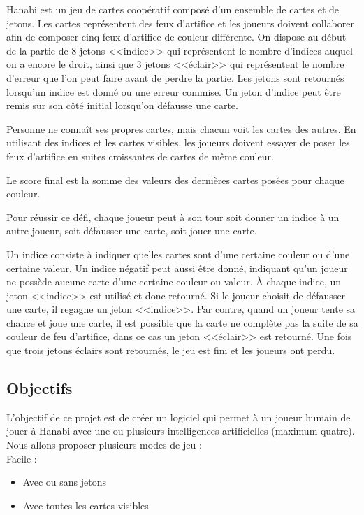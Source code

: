 \documentclass{article}
\begin{document}
Hanabi est un jeu de cartes coopératif composé d'un ensemble de cartes et de jetons. Les cartes représentent des feux d'artifice et les joueurs doivent collaborer afin de composer cinq feux d'artifice de couleur différente. On dispose au début de la partie de 8 jetons <<indice>> qui représentent le nombre d'indices auquel on a encore le droit, ainsi que 3 jetons <<éclair>> qui représentent le nombre d'erreur que l'on peut faire avant de perdre la partie. Les jetons sont retournés lorsqu'un indice est donné ou une erreur commise. Un jeton d'indice peut être remis sur son côté initial lorsqu'on défausse une carte.   

Personne ne connaît ses propres cartes, mais chacun voit les cartes des autres. En utilisant des indices et les cartes visibles, les joueurs doivent essayer de poser les feux d'artifice en suites croissantes de cartes de même couleur.

Le score final est la somme des valeurs des dernières cartes posées pour chaque couleur.

Pour réussir ce défi, chaque joueur peut à son tour soit donner un indice à un autre joueur, soit défausser une carte, soit jouer une carte. 

Un indice consiste à indiquer quelles cartes sont d'une certaine couleur ou d'une certaine valeur. Un indice négatif peut aussi être donné, indiquant qu'un joueur ne possède aucune carte d'une certaine couleur ou valeur. À chaque indice, un jeton <<indice>> est utilisé et donc retourné. Si le joueur choisit de défausser une carte, il regagne un jeton <<indice>>. Par contre, quand un joueur tente sa chance et joue une carte, il est possible que la carte ne complète pas la suite de sa couleur de feu d'artifice, dans ce cas un jeton <<éclair>> est retourné. Une fois que trois jetons éclairs sont retournés, le jeu est fini et les joueurs ont perdu.


\subsection{Objectifs}

L’objectif de ce projet est de créer un logiciel qui permet à un joueur humain de jouer à Hanabi avec une ou plusieurs intelligences artificielles (maximum quatre). Nous allons proposer plusieurs modes de jeu :\\

 Facile :

\begin{itemize}

 \item Avec ou sans jetons
 \item Avec toutes les cartes visibles
 
\end{itemize}
\end{document}
